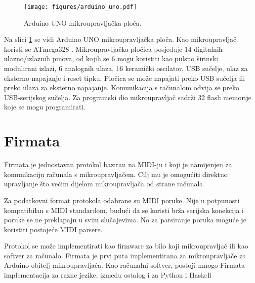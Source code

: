 \begin{figure}[H]
\centering
\texttt{[image: figures/arduino\_uno.pdf]}
\caption{Arduino UNO mikroupravljačka ploča.\protect\footnotemark}
\label{fig:arduino}
\end{figure}


Na slici \ref{fig:arduino} se vidi Arduino UNO mikroupravljačka ploča. Kao
mikroupravljač koristi se ATmega328 \cite{atmega}. Mikroupravljačka pločica posjeduje 14
digitalnih ulazno/izlaznih pinova, od kojih se 6 mogu koristiti kao pulsno
širinski modulirani izlazi, 6 analognih ulaza, \unit{16}{\mega\hertz} keramički
oscilator, USB sučelje, ulaz za eksterno napajanje i reset tipku. Pločica se
može napajati preko USB sučelja ili preko ulaza za eksterno napajanje.
Komunikacija s računalom odvija se preko USB-serijskog sučelja. Za programski
dio mikroupravljač sadrži \unit{32}{\kilo\byte} flash memorije koje se mogu programirati.

\newpage
\section{Firmata}

Firmata je jednostavan protokol baziran na MIDI-ju i koji je namijenjen za komunikaciju
računala s mikroupravljačem. Cilj mu je omogućiti direktno upravljanje što većim
dijelom mikroupravljača od strane računala.

Za podatkovni format protokola odabrane su MIDI \cite{midi} poruke. Nije u
potpunosti kompatibilan s MIDI standardom, budući da se koristi brža serijska
konekcija i poruke se ne preklapaju u svim slučajevima. No za parsiranje poruka
moguće je koristiti postojeće MIDI parsere.

Protokol se može implementirati kao firmware za bilo koji mikroupravljač ili kao
softver za računalo. Firmata je prvi puta implementirana za mikroupravljače za
Arduino obitelj mikroupravljača. Kao računalni softver, postoji mnogo Firmata 
implementacija za razne jezike, između ostalog i za Python \cite{pyfirmata}
i Haskell \cite{harduino}

